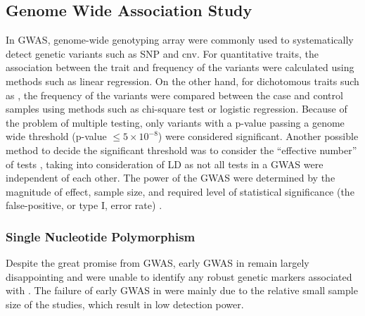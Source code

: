 	\subsection{Genome Wide Association Study}
	In \gls{GWAS}, genome-wide genotyping array were commonly used to systematically detect genetic variants such as \gls{SNP} and \gls{cnv}.
	For quantitative traits, the association between the trait and frequency of the variants were calculated using methods such as linear regression.
	On the other hand, for dichotomous traits such as , the frequency of the variants were compared between the case and control samples using methods such as chi-square test or logistic regression.
	Because of the problem of multiple testing, only variants with a p-value passing a genome wide threshold (p-value $\le5\times10^{-8}$) were considered significant.
	Another possible method to decide the significant threshold was to consider the ``effective number'' of tests \citep{Li2011}, taking into consideration of \gls{LD} as not all tests in a \gls{GWAS} were independent of each other. 
	The power of the \gls{GWAS} were determined by the magnitude of effect, sample size, and required level of statistical significance (the false-positive, or type I, error rate) \citep{Purcell2003}.
	
	\subsubsection{Single Nucleotide Polymorphism} 
	Despite the great promise from \gls{GWAS}, early \gls{GWAS} in  remain largely disappointing and were unable to identify any robust genetic markers associated with .
	The failure of early \gls{GWAS} in  were mainly due to the relative small sample size of the studies, which result in low detection power.
	
